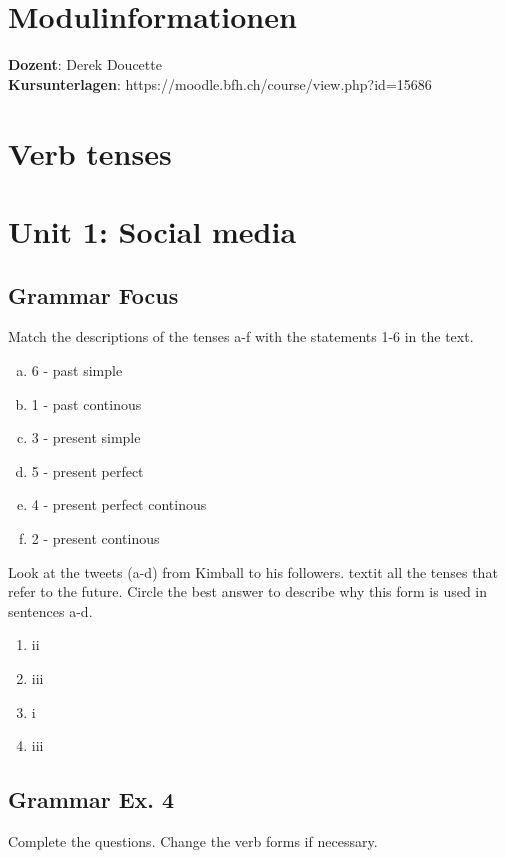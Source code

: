 \documentclass[12pt, a4paper, oneside]{article}
\title{\vspace{-1.5cm}\subjectIdentifier{}\\\subject{}}
\author{\vspace{-1.5cm}}
\date{\vspace{-1.5cm}}
\begin{document}
  \maketitle
  \thispagestyle{fancy}
  
  \section{Modulinformationen}
  {\bf Dozent}: Derek Doucette\\
  {\bf Kursunterlagen}: https://moodle.bfh.ch/course/view.php?id=15686\\
  
  \section{Verb tenses}

  \newpage
  \section{Unit 1: Social media}
  \subsection{Grammar Focus}
  
  Match the descriptions of the tenses a-f with the statements 1-6 in the text.
  \begin{enumerate}[a)] 
    \item 6 - past simple
    \item 1 - past continous
    \item 3 - present simple
    \item 5 - present perfect
    \item 4 - present perfect continous
    \item 2 - present continous
  \end{enumerate}

  Look at the tweets (a-d) from Kimball to his followers. textit all the tenses that refer to the future. Circle the best answer to describe why this form is used in sentences a-d.
  \begin{enumerate}[1.]
    \item ii
    \item iii
    \item i
    \item iii
  \end{enumerate}

  \subsection{Grammar Ex.  4}
  Complete the questions. Change the verb forms if necessary.
\end{document}
